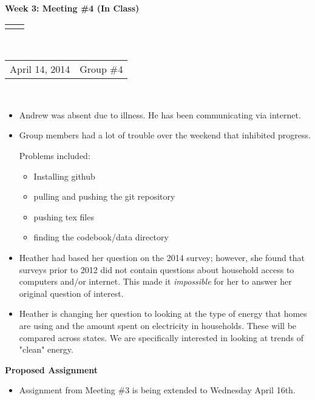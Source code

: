 \documentclass[12pt]{article}
\renewcommand{\title}[1]{\textbf{#1}\\}
\renewcommand{\line}{\begin{tabularx}{\textwidth}{X>{\raggedleft}X}\hline\\\end{tabularx}\\[-0.5cm]}
\newcommand{\leftright}[2]{\begin{tabularx}{\textwidth}{X>{\raggedleft}X}#1%
& #2\\\end{tabularx}\\[-0.5cm]}
\begin{document}
\title{Week 3: Meeting \#4 (In Class)}
\line
\leftright{April 14, 2014}{Group \#4} %
\vspace{5mm}

\begin{itemize}
\item Andrew was absent due to illness.  He has been communicating via internet. 

\item Group members had a lot of trouble over the weekend that inhibited progress. 

Problems included: 
\begin{itemize}
\item Installing github
\item pulling and pushing the git repository 
\item pushing tex files
\item finding the codebook/data directory
\end{itemize}


\item Heather had based her question on the 2014 survey; however, she found that surveys prior to 2012 did not contain questions about household access to computers and/or internet.  This made it \emph{impossible} for her to answer her original question of interest. 
\item Heather is changing her question to looking at the type of energy that homes are using and the amount spent on electricity in households.  These will be compared across states. We are specifically interested in looking at trends of "clean" energy. 
\end{itemize}

\textbf{Proposed Assignment}
\begin{itemize}
\item Assignment from Meeting \#3 is being extended to Wednesday April 16th. 
\end{itemize}





\end{document}
